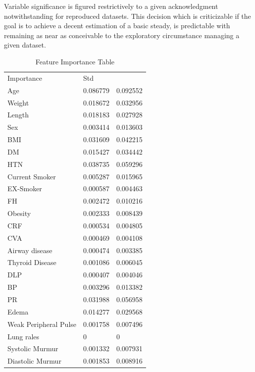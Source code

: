 \documentclass[sigconf]{acmart}
\begin{document}
Variable significance is figured restrictively to a given acknowledgment notwithstanding for reproduced datasets. This decision which is criticizable if the goal is to achieve a decent estimation of a basic steady, is predictable with remaining as near as conceivable to the exploratory circumstance managing a given dataset\cite{GENUER20102225}.

\begin{table}[]
\centering
\caption{Feature Importance Table}
\label{my-label}
\begin{tabular}{lll}
Importance            & Std      &          \\
Age                   & 0.086779 & 0.092552 \\
Weight                & 0.018672 & 0.032956 \\
Length                & 0.018183 & 0.027928 \\
Sex                   & 0.003414 & 0.013603 \\
BMI                   & 0.031609 & 0.042215 \\
DM                    & 0.015427 & 0.034442 \\
HTN                   & 0.038735 & 0.059296 \\
Current Smoker        & 0.005287 & 0.015965 \\
EX-Smoker             & 0.000587 & 0.004463 \\
FH                    & 0.002472 & 0.010216 \\
Obesity               & 0.002333 & 0.008439 \\
CRF                   & 0.000534 & 0.004805 \\
CVA                   & 0.000469 & 0.004108 \\
Airway disease        & 0.000474 & 0.003385 \\
Thyroid Disease       & 0.001086 & 0.006045 \\
DLP                   & 0.000407 & 0.004046 \\
BP                    & 0.003296 & 0.013382 \\
PR                    & 0.031988 & 0.056958 \\
Edema                 & 0.014277 & 0.029568 \\
Weak Peripheral Pulse & 0.001758 & 0.007496 \\
Lung rales            & 0        & 0        \\
Systolic Murmur       & 0.001332 & 0.007931 \\
Diastolic Murmur      & 0.001853 & 0.008916 \\

\end{tabular}
\end{table}
\end{document}
